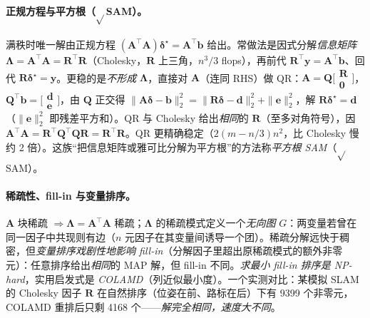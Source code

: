 \paragraph{正规方程与平方根（$\sqrt{}$SAM）。}
满秩时唯一解由正规方程 $(\mathbf{A}^\top\mathbf{A})\boldsymbol{\delta}^\star=\mathbf{A}^\top\mathbf{b}$ 给出。常做法是因式分解\emph{信息矩阵} $\boldsymbol{\Lambda}=\mathbf{A}^\top\mathbf{A}=\mathbf{R}^\top\mathbf{R}$（Cholesky，$\mathbf{R}$ 上三角，$n^3/3$ flops），再前代 $\mathbf{R}^\top\mathbf{y}=\mathbf{A}^\top\mathbf{b}$、回代 $\mathbf{R}\boldsymbol{\delta}^\star=\mathbf{y}$\cite{carlone2026handbook}。更稳的是\emph{不形成} $\boldsymbol{\Lambda}$，直接对 $\mathbf{A}$（连同 RHS）做 QR：$\mathbf{A}=\mathbf{Q}\big[\begin{smallmatrix}\mathbf{R}\\\mathbf{0}\end{smallmatrix}\big]$，$\mathbf{Q}^\top\mathbf{b}=\big[\begin{smallmatrix}\mathbf{d}\\\mathbf{e}\end{smallmatrix}\big]$，由 $\mathbf{Q}$ 正交得 $\|\mathbf{A}\boldsymbol{\delta}-\mathbf{b}\|_2^2=\|\mathbf{R}\boldsymbol{\delta}-\mathbf{d}\|_2^2+\|\mathbf{e}\|_2^2$，解 $\mathbf{R}\boldsymbol{\delta}^\star=\mathbf{d}$（$\|\mathbf{e}\|_2^2$ 即残差平方和）。QR 与 Cholesky 给出\emph{相同}的 $\mathbf{R}$（至多对角符号），因 $\mathbf{A}^\top\mathbf{A}=\mathbf{R}^\top\mathbf{Q}^\top\mathbf{Q}\mathbf{R}=\mathbf{R}^\top\mathbf{R}$。QR 更精确稳定（$2(m-n/3)n^2$，比 Cholesky 慢约 2 倍）。这族“把信息矩阵或雅可比分解为平方根”的方法称\emph{平方根 SAM}（$\sqrt{}$SAM）\cite{dellaert2017factor}。

\paragraph{稀疏性、fill-in 与变量排序。}
$\mathbf{A}$ 块稀疏 $\Rightarrow\boldsymbol{\Lambda}=\mathbf{A}^\top\mathbf{A}$ 稀疏；$\boldsymbol{\Lambda}$ 的稀疏模式定义一个\emph{无向图} $G$：两变量若曾在同一因子中共现则有边（$n$ 元因子在其变量间诱导一个团）。稀疏分解远快于稠密，但\emph{变量排序戏剧性地影响 fill-in}（分解因子里超出原稀疏模式的额外非零元）：任意排序给出\emph{相同}的 MAP 解，但 fill-in 不同。\emph{求最小 fill-in 排序是 NP-hard}，实用启发式是 \emph{COLAMD}（列近似最小度）\cite{carlone2026handbook}。一个实测对比：某模拟 SLAM 的 Cholesky 因子 $\mathbf{R}$ 在自然排序（位姿在前、路标在后）下有 9399 个非零元，COLAMD 重排后只剩 4168 个——\emph{解完全相同，速度大不同}。

